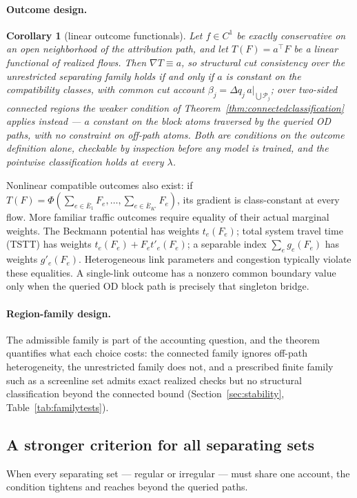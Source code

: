\documentclass[a4paper,fleqn]{cas-sc}
\newtheorem{corollary}[theorem]{Corollary}
\begin{document}
\paragraph{Outcome design.}
\begin{corollary}[linear outcome functionals]\label{cor:linear}
Let $f\in C^1$ be exactly conservative on an open neighborhood of the
attribution path, and let $T(F)=a^\top F$ be a linear functional of
realized flows. Then $\nabla T\equiv a$, so structural cut consistency
over the unrestricted separating family holds if and only if $a$ is
constant on the compatibility classes, with common cut account
$\beta_j=\Delta q_j\,a|_{\bigcup\mathcal{P}_j}$; over two-sided
connected regions the weaker condition of
Theorem~\ref{thm:connectedclassification} applies instead --- $a$
constant on the block atoms traversed by the queried OD paths, with no
constraint on off-path atoms. Both are conditions on the outcome
definition alone, checkable by inspection before any model is trained,
and the pointwise classification holds at every $\lambda$.
\end{corollary}
Nonlinear compatible outcomes also exist: if
$T(F)=\Phi(\sum_{e\in\bar E_1}F_e,\ldots,\sum_{e\in\bar E_{K'}}F_e)$,
its gradient is class-constant at every flow. More familiar traffic outcomes
require equality of their actual marginal weights. The Beckmann potential
has weights $t_e(F_e)$; total system travel time (TSTT) has weights
$t_e(F_e)+F_et'_e(F_e)$; a separable index $\sum_e g_e(F_e)$ has
weights $g'_e(F_e)$. Heterogeneous link parameters and congestion typically
violate these equalities. A single-link outcome has a nonzero common boundary value
only when the queried OD block path is precisely that singleton bridge.
\paragraph{Region-family design.}
The admissible family is part of the accounting question, and the theorem
quantifies what each choice costs: the connected family ignores off-path
heterogeneity, the unrestricted family does not, and a prescribed finite
family such as a screenline set admits exact realized checks but no
structural classification beyond the connected bound
(Section~\ref{sec:stability}, Table~\ref{tab:familytests}).

\subsection{A stronger criterion for all separating sets}\label{sec:allsets}
When every separating set --- regular or irregular --- must share one
account, the condition tightens and reaches beyond the queried paths.
\end{document}
